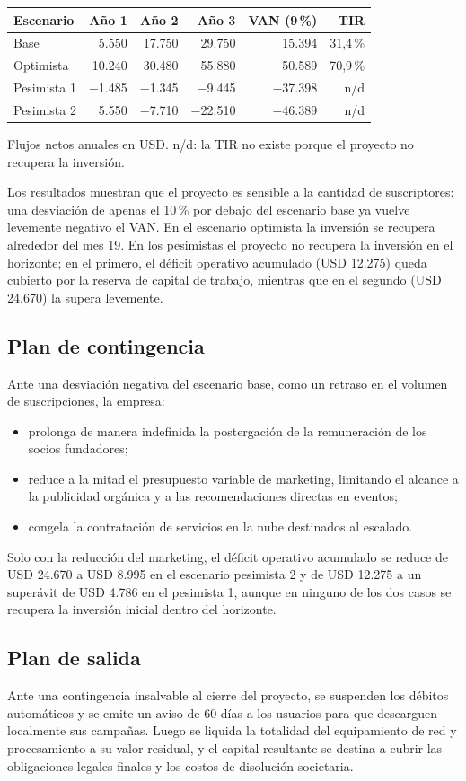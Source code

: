 \begin{center}
\small
\begin{tabularx}{\textwidth}{|X|r|r|r|r|r|}
\hline
\textbf{Escenario} & \textbf{Año 1} & \textbf{Año 2} & \textbf{Año 3} & \textbf{VAN (9\,\%)} & \textbf{TIR}\\ \hline
Base & 5.550 & 17.750 & 29.750 & 15.394 & 31,4\,\%\\ \hline
Optimista & 10.240 & 30.480 & 55.880 & 50.589 & 70,9\,\%\\ \hline
Pesimista 1 & $-$1.485 & $-$1.345 & $-$9.445 & $-$37.398 & n/d\\ \hline
Pesimista 2 & 5.550 & $-$7.710 & $-$22.510 & $-$46.389 & n/d\\ \hline
\end{tabularx}
\end{center}
\small Flujos netos anuales en USD. n/d: la TIR no existe porque el proyecto no recupera la inversión.\normalsize

\medskip
Los resultados muestran que el proyecto es sensible a la cantidad de suscriptores: una desviación de apenas el 10\,\% por debajo del escenario base ya vuelve levemente negativo el VAN. En el escenario optimista la inversión se recupera alrededor del mes 19. En los pesimistas el proyecto no recupera la inversión en el horizonte; en el primero, el déficit operativo acumulado (USD 12.275) queda cubierto por la reserva de capital de trabajo, mientras que en el segundo (USD 24.670) la supera levemente.

\subsection{Plan de contingencia}
Ante una desviación negativa del escenario base, como un retraso en el volumen de suscripciones, la empresa:
\begin{itemize}
  \item prolonga de manera indefinida la postergación de la remuneración de los socios fundadores;
  \item reduce a la mitad el presupuesto variable de marketing, limitando el alcance a la publicidad orgánica y a las recomendaciones directas en eventos;
  \item congela la contratación de servicios en la nube destinados al escalado.
\end{itemize}
Solo con la reducción del marketing, el déficit operativo acumulado se reduce de USD 24.670 a USD 8.995 en el escenario pesimista 2 y de USD 12.275 a un superávit de USD 4.786 en el pesimista 1, aunque en ninguno de los dos casos se recupera la inversión inicial dentro del horizonte.

\subsection{Plan de salida}
Ante una contingencia insalvable al cierre del proyecto, se suspenden los débitos automáticos y se emite un aviso de 60 días a los usuarios para que descarguen localmente sus campañas. Luego se liquida la totalidad del equipamiento de red y procesamiento a su valor residual, y el capital resultante se destina a cubrir las obligaciones legales finales y los costos de disolución societaria.
